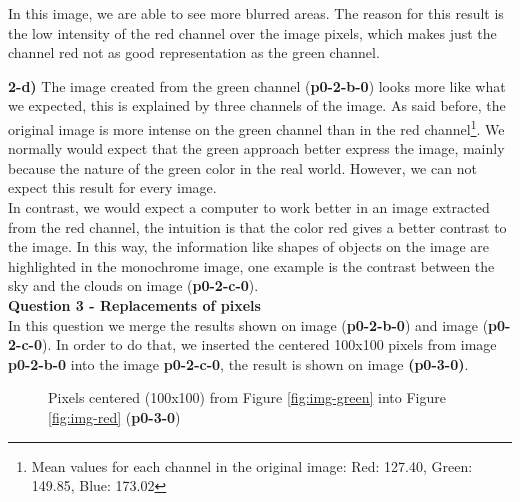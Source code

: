 \documentclass[12pt,a4paper]{article}
\begin{document}
In this image, we are able to see more blurred areas. The reason for this result is the low intensity of the red channel over the image pixels, which makes just the channel red not as good representation as the green channel.

\textbf{2-d) } The image created from the green channel (\textbf{p0-2-b-0}) looks more like what we expected, this is explained by three channels of the image. As said before, the original image is more intense on the green channel than in the red channel\footnote{Mean values for each channel in the original image: Red: 127.40, Green: 149.85, Blue: 173.02}. We normally would expect that the green approach better express the image, mainly because the nature of the green color in the real world. However, we can not expect this result for every image. \\

In contrast, we would expect a computer to work better in an image extracted from the red channel, the intuition is that the color red gives a better contrast to the image. In this way, the information like shapes of objects on the image are highlighted in the monochrome image, one example is the contrast between the sky and the clouds on image (\textbf{p0-2-c-0}). \\

\textbf{Question 3 - Replacements of pixels} \\

In this question we merge the results shown on image (\textbf{p0-2-b-0}) and image (\textbf{p0-2-c-0}). In order to do that, we inserted the centered 100x100 pixels from image \textbf{p0-2-b-0} into the image \textbf{p0-2-c-0}, the result is shown on image \textbf{(p0-3-0)}. 


\begin{figure}[!h]
	\centering
	{%
		\setlength{\fboxsep}{1pt}%
		\setlength{\fboxrule}{1pt}%
	}%
	\caption{Pixels centered (100x100) from Figure \ref{fig:img-green} into Figure \ref{fig:img-red} (\textbf{p0-3-0})}
	\label{fig:p0-3-0}
\end{figure}
\end{document}
